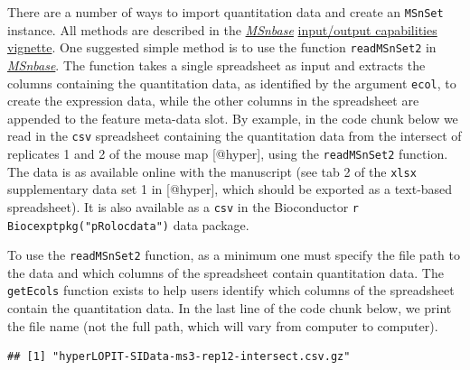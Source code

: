 There are a number of ways to import quantitation data and create an
\texttt{MSnSet} instance. All methods are described in the
\emph{\href{http://bioconductor.org/packages/MSnbase}{MSnbase}}
\href{http://bioconductor.org/packages/release/bioc/vignettes/MSnbase/inst/doc/MSnbase-io.pdf}{input/output
capabilities vignette}. One suggested simple method is to use the
function \texttt{readMSnSet2} in
\emph{\href{http://bioconductor.org/packages/MSnbase}{MSnbase}}. The
function takes a single spreadsheet as input and extracts the columns
containing the quantitation data, as identified by the argument
\texttt{ecol}, to create the expression data, while the other columns in
the spreadsheet are appended to the feature meta-data slot. By example,
in the code chunk below we read in the \texttt{csv} spreadsheet
containing the quantitation data from the intersect of replicates 1 and
2 of the mouse map {[}@hyper{]}, using the \texttt{readMSnSet2}
function. The data is as available online with the manuscript (see tab 2
of the \texttt{xlsx} supplementary data set 1 in {[}@hyper{]}, which
should be exported as a text-based spreadsheet). It is also available as
a \texttt{csv} in the Bioconductor \texttt{r Biocexptpkg("pRolocdata")}
data package.

To use the \texttt{readMSnSet2} function, as a minimum one must specify
the file path to the data and which columns of the spreadsheet contain
quantitation data. The \texttt{getEcols} function exists to help users
identify which columns of the spreadsheet contain the quantitation data.
In the last line of the code chunk below, we print the file name (not
the full path, which will vary from computer to computer).

\begin{Shaded}
\begin{Highlighting}[]
\NormalTok{(}\NormalTok{)}
\StringTok{ }\NormalTok{(}\NormalTok{, } \NormalTok{)}
\StringTok{ } \NormalTok{,}
           \NormalTok{)}
\end{Highlighting}
\end{Shaded}

\begin{verbatim}
## [1] "hyperLOPIT-SIData-ms3-rep12-intersect.csv.gz"
\end{verbatim}

